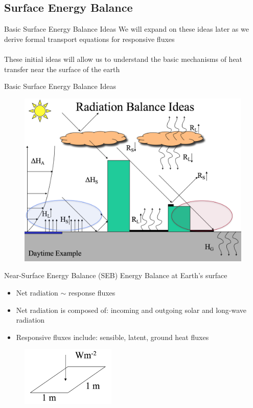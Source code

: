 \subsection{Surface Energy Balance}
\begin{frame}{Basic Surface Energy Balance Ideas}
We will expand on these ideas later as we derive formal transport equations for responsive fluxes
~\\~\\
These initial ideas will allow us to understand the basic mechanisms of heat transfer near the surface of the earth
\end{frame}

\begin{frame}{Basic Surface Energy Balance Ideas}
\begin{figure}
	\includegraphics[width=1\textwidth]{rad1.png}
\end{figure}
\end{frame}

\begin{frame}{Near-Surface Energy Balance (SEB)}
Energy Balance at Earth's surface
\begin{itemize}
	\item Net radiation $\sim$ response fluxes
	\item Net radiation is composed of: incoming and outgoing solar and long-wave radiation
	\item Responsive fluxes include: sensible, latent, ground heat fluxes
\end{itemize}
\begin{figure}
	\includegraphics[width=0.4\textwidth]{rad2.png}
\end{figure}
\end{frame}

